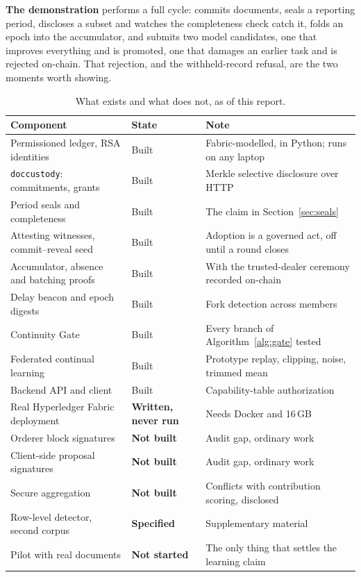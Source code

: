 \documentclass[11pt,a4paper]{article}
\begin{document}
\textbf{The demonstration} performs a full cycle: commits documents, seals a
reporting period, discloses a subset and watches the completeness check catch it,
folds an epoch into the accumulator, and submits two model candidates, one that
improves everything and is promoted, one that damages an earlier task and is
rejected on-chain. That rejection, and the withheld-record refusal, are the two
moments worth showing.

\begin{table}[htbp]
\centering
\caption{What exists and what does not, as of this report.}
\label{tab:plan}
\small
\begin{tabularx}{\textwidth}{@{}l l Y@{}}
\toprule
\textbf{Component} & \textbf{State} & \textbf{Note} \\
\midrule
Permissioned ledger, RSA identities & Built & Fabric-modelled, in Python; runs on any laptop \\
\texttt{doccustody}: commitments, grants & Built & Merkle selective disclosure over HTTP \\
Period seals and completeness & Built & The claim in Section~\ref{sec:seals} \\
Attesting witnesses, commit--reveal seed & Built & Adoption is a governed act, off until a round closes \\
Accumulator, absence and batching proofs & Built & With the trusted-dealer ceremony recorded on-chain \\
Delay beacon and epoch digests & Built & Fork detection across members \\
Continuity Gate & Built & Every branch of Algorithm~\ref{alg:gate} tested \\
Federated continual learning & Built & Prototype replay, clipping, noise, trimmed mean \\
Backend API and client & Built & Capability-table authorization \\
Real Hyperledger Fabric deployment & \textbf{Written, never run} & Needs Docker and 16\,GB \\
Orderer block signatures & \textbf{Not built} & Audit gap, ordinary work \\
Client-side proposal signatures & \textbf{Not built} & Audit gap, ordinary work \\
Secure aggregation & \textbf{Not built} & Conflicts with contribution scoring, disclosed \\
Row-level detector, second corpus & \textbf{Specified} & Supplementary material \\
Pilot with real documents & \textbf{Not started} & The only thing that settles the learning claim \\
\bottomrule
\end{tabularx}
\end{table}
\end{document}
